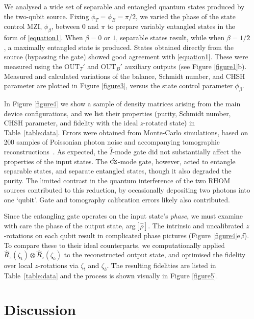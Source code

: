 \documentclass[
twocolumn,
 amsmath,amssymb,
 aps,
  twoside,
 superscriptaddress,
pra,
longbibliography
]{revtex4-1}
\begin{document}
We analysed a wide set of separable and entangled quantum states produced by the two-qubit source. Fixing $\phi_T = \phi_B = \pi/2$, we varied the phase of the state control MZI, $\phi_\beta$, between $0$ and $\pi$ to prepare variably entangled states in the form of \eqref{equation1}. When $\beta = 0$ or $1$, separable states result, while  when $\beta = 1/2$, a maximally entangled state is produced. States obtained directly from the source (bypassing the gate) showed good agreement with \eqref{equation1}. These were measured using the {$\mathrm{OUT}_T'$} and {$\mathrm{OUT}_B'$} auxiliary outputs (see {Figure \ref{figure1}b}). Measured and calculated variations of the balance, Schmidt number, and CHSH parameter are plotted in Figure \ref{figure3}, versus the state control parameter $\phi_\beta$. 

In Figure \ref{figure4} we show a sample of density matrices arising from the main device configurations, and we list their properties (purity, Schmidt number, CHSH parameter, and fidelity with the ideal $z$-rotated state) in Table~\ref{table:data}. Errors were obtained from Monte-Carlo simulations, based on 200 samples of Poissonian photon noise and accompanying tomographic reconstructions~\cite{Roos:2004hm}. As expected, the $\hat{I}$-mode gate did not substantially affect the properties of the input states. The $\hat{\textsc{cz}}$-mode gate, however, acted to entangle separable states, and separate entangled states, though it also degraded the purity. The limited contrast in the quantum interference of the two RHOM sources contributed to this reduction, by occasionally depositing two photons into one `qubit'. Gate and tomography calibration errors likely also contributed. 

Since the entangling gate operates on the input state's \emph{phase}, we must examine with care the phase of the output state, $\mathrm{arg}[\hat\rho]$. The intrinsic and uncalibrated $z$-rotations on each qubit result in complicated phase pictures (Figure \ref{figure4}e,f). {To compare these to their ideal counterparts, we computationally applied $\hat R_z(\zeta_t) \otimes \hat R_z(\zeta_b)$ to the reconstructed output state, and optimised the fidelity over local $z$-rotations via $\zeta_t$ and $\zeta_b$. The resulting fidelities are listed in {Table~\ref{table:data}} and the process is shown visually in Figure \ref{figure5}.}



\section*{Discussion}
\end{document}

